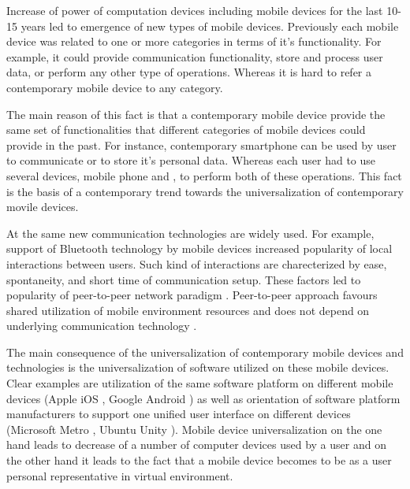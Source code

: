%
Increase of power of computation devices including mobile devices for the last 10-15 years led to emergence of new types of mobile devices. 
%
Previously each mobile device was related to one or more categories in terms of it's functionality. 
%
For example, it could provide communication functionality, store and process user data, or perform any other type of operations. 
%
Whereas it is hard to refer a contemporary mobile device to any category. 

%
The main reason of this fact is that a contemporary mobile device provide the same set of functionalities that different categories of mobile devices could provide in the past. 
%
For instance, contemporary smartphone can be used by user to communicate or to store it's personal data. 
%
Whereas each user had to use several devices, mobile phone and , to perform both of these operations. 
%
This fact is the basis of a contemporary trend towards the universalization of contemporary movile devices. 

%
At the same new communication technologies are widely used. 
%
For example, support of Bluetooth  technology by mobile devices increased popularity of local interactions between users. 
%
Such kind of interactions are charecterized by ease, spontaneity, and short time of communication setup. 
%
These factors led to popularity of peer-to-peer network paradigm . 
%
Peer-to-peer approach favours shared utilization of mobile environment resources and does not depend on underlying communication technology  . 

%
The main consequence of the universalization of contemporary mobile devices and technologies is the universalization of software utilized on these mobile devices. 
%
Clear examples are utilization of the same software platform on different mobile devices (Apple iOS , Google Android ) as well as orientation of software platform manufacturers to support one unified user interface on different devices (Microsoft Metro , Ubuntu Unity ). 
%
Mobile device universalization on the one hand leads to decrease of a number of computer devices used by a user and on the other hand it leads to the fact that a mobile device becomes to be as a user personal representative in virtual environment. 

